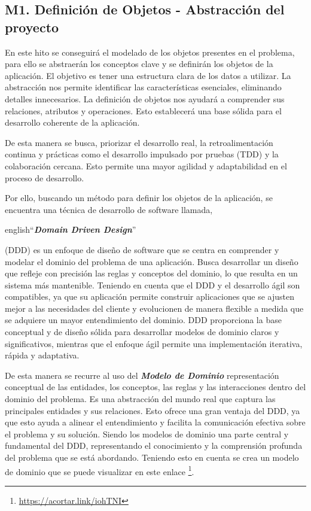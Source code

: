 \subsection{M1. Definición de Objetos - Abstracción del proyecto}

En este hito se conseguirá el modelado de los objetos presentes en el problema, para ello se abstraerán los conceptos clave y se definirán los objetos de la aplicación. El objetivo es tener una estructura clara de los datos a utilizar. La abstracción nos permite identificar las características esenciales, eliminando detalles innecesarios. La definición de objetos nos ayudará a comprender sus relaciones, atributos y operaciones. Esto establecerá una base sólida para el desarrollo coherente de la aplicación.

De esta manera se busca, priorizar el desarrollo real, la retroalimentación continua y prácticas como el desarrollo impulsado por pruebas (TDD) y la colaboración cercana. Esto permite una mayor agilidad y adaptabilidad en el proceso de desarrollo.

Por ello, buscando un método para definir los objetos de la aplicación, se encuentra una técnica de desarrollo de software llamada, \begin{otherlanguage}
{english}``\textit{\textbf{Domain Driven Design}}''\end{otherlanguage}(DDD) es un enfoque de diseño de software que se centra en comprender y modelar el dominio del problema de una aplicación. Busca desarrollar un diseño que refleje con precisión las reglas y conceptos del dominio, lo que resulta en un sistema más mantenible. Teniendo en cuenta que el DDD y el desarrollo ágil son compatibles, ya que su aplicación permite construir aplicaciones que se ajusten mejor a las necesidades del cliente y evolucionen de manera flexible a medida que se adquiere un mayor entendimiento del dominio. DDD proporciona la base conceptual y de diseño sólida para desarrollar modelos de dominio claros y significativos, mientras que el enfoque ágil permite una implementación iterativa, rápida y adaptativa.

De esta manera se recurre al uso del \textit{\textbf{Modelo de Dominio}} representación conceptual de las entidades, los conceptos, las reglas y las interacciones dentro del dominio del problema. Es una abstracción del mundo real que captura las principales entidades y sus relaciones. Esto ofrece una gran ventaja del DDD, ya que esto ayuda a alinear el entendimiento y facilita la comunicación efectiva sobre el problema y su solución. Siendo los modelos de dominio una parte central y fundamental del DDD, representando el conocimiento y la comprensión profunda del problema que se está abordando. Teniendo esto en cuenta se crea un modelo de dominio que se puede visualizar en este enlace \footnote{\url{https://acortar.link/iohTNI}}.

